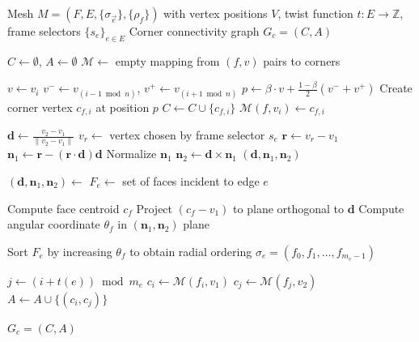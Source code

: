 \documentclass[acmtog,anonymous,review]{acmart}
\begin{document}
\begin{algorithm}[htb]
\caption{Twisted Corner Connectivity Graph Construction}
\label{alg:corner_graph}
\begin{algorithmic}[1]
\Require Mesh $M = (F, E, \{\sigma_{\vec{e}}\}, \{\rho_f\})$ with vertex positions $V$, twist function $t : E \to \mathbb{Z}$, frame selectors $\{s_e\}_{e \in E}$
\Ensure Corner connectivity graph $G_c = (C, A)$

\State $C \gets \emptyset$, $A \gets \emptyset$
\State $\mathcal{M} \gets$ empty mapping from $(f, v)$ pairs to corners

            \State $v \gets v_i$
            \State $v^- \gets v_{(i-1 \bmod n)}$, $v^+ \gets v_{(i+1 \bmod n)}$
            \State $p \gets \beta \cdot v + \frac{1-\beta}{2}(v^- + v^+)$ 
            \State Create corner vertex $c_{f,i}$ at position $p$
            \State $C \gets C \cup \{c_{f,i}\}$
            \State $\mathcal{M}(f, v_i) \gets c_{f,i}$
        \EndFor
    \EndFor
\EndFunction

    \State $\mathbf{d} \gets \frac{v_2 - v_1}{\|v_2 - v_1\|}$ 
    \State $v_r \gets$ vertex chosen by frame selector $s_e$
    \State $\mathbf{r} \gets v_r - v_1$
    \State $\mathbf{n}_1 \gets \mathbf{r} - (\mathbf{r} \cdot \mathbf{d})\mathbf{d}$ 
    \State Normalize $\mathbf{n}_1$
    \State $\mathbf{n}_2 \gets \mathbf{d} \times \mathbf{n}_1$ 
    \State \Return $(\mathbf{d}, \mathbf{n}_1, \mathbf{n}_2)$
\EndFunction

    \State $(\mathbf{d}, \mathbf{n}_1, \mathbf{n}_2) \gets$ 
    \State $F_e \gets$ set of faces incident to edge $e$
    
        \State Compute face centroid $c_f$
        \State Project $(c_f - v_1)$ to plane orthogonal to $\mathbf{d}$
        \State Compute angular coordinate $\theta_f$ in $(\mathbf{n}_1, \mathbf{n}_2)$ plane
    \EndFor
    
    \State Sort $F_e$ by increasing $\theta_f$ to obtain radial ordering $\sigma_e = (f_0, f_1, \dots, f_{m_e-1})$
    
        \State $j \gets (i + t(e)) \bmod m_e$ 
            \State $c_i \gets \mathcal{M}(f_i, v_1)$ 
            \State $c_j \gets \mathcal{M}(f_j, v_2)$ 
            \State $A \gets A \cup \{(c_i, c_j)\}$ 
    \EndFor
\EndFunction

\State {}
    \State {}
\EndFor

\State \Return $G_c = (C, A)$
\end{algorithmic}
\end{algorithm}
\end{document}
